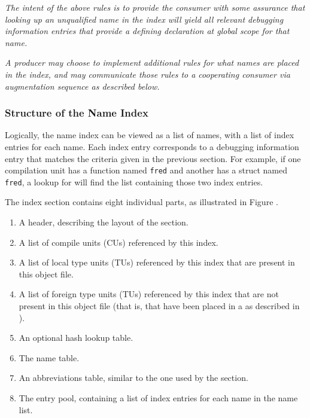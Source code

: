 \textit{The intent of the above rules is to provide the consumer with
some assurance that looking up an unqualified name in the index
will yield all relevant debugging information entries
that provide a defining declaration
at global scope for that name.}

\textit{A producer may choose to implement additional rules for what
names are placed in the index, and may communicate those rules to
a cooperating consumer via 
\bb 
augmentation sequence as
\eb
described below.}

\subsubsection{Structure of the Name Index}
\label{chap:structureofthenametindex}
Logically, the name index can be viewed as a list of names, 
with a list of index entries for each name. Each index entry 
corresponds to a debugging information entry 
that matches the criteria given in the previous section. For
example, if one compilation unit has a function named \texttt{fred} 
and another has a struct named \texttt{fred}, a lookup for 
 will find the list containing those two index 
entries.

The index section contains eight individual parts, as illustrated in 
Figure .
\begin{enumerate}
\item A header, describing the layout of the section.

\item A list of compile units (CUs) referenced by this index.

\item A list of local type units (TUs) referenced by this index
    that are present in this object file.

\item A list of foreign type units (TUs) referenced by this index
    that are not present in this object file (that is, that have
    been placed in a \splitDWARFobjectfile{} as described in
    ).

\item An optional hash lookup table.

\item The name table.

\item An abbreviations table, similar to the one used by the
    \dotdebuginfo{} section.

\item The entry pool, containing a list of index entries for each
    name in the name list.
\end{enumerate}

